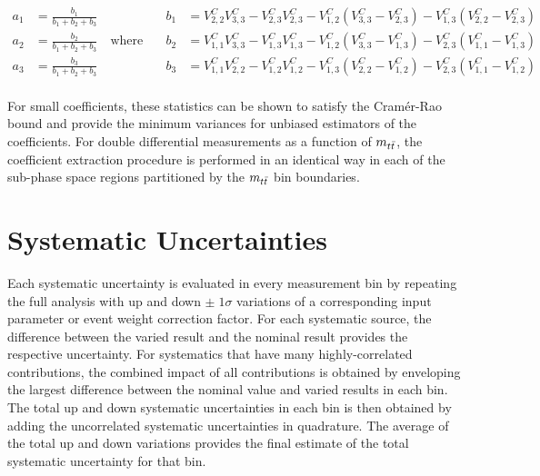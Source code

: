 \begin{linenomath*}
\begin{align*}
  a_1 &= \frac{b_1}{b_1+b_2+b_3} \quad \quad & b_1 &= V^C_{2,2}V^C_{3,3} - V^C_{2,3}V^C_{2,3} - V^C_{1,2}(V^C_{3,3}-V^C_{2,3}) - V^C_{1,3}(V^C_{2,2}-V^C_{2,3}) \\
  a_2 &= \frac{b_2}{b_1+b_2+b_3} \quad \text{where} \quad & b_2 &= V^C_{1,1}V^C_{3,3} - V^C_{1,3}V^C_{1,3} - V^C_{1,2}(V^C_{3,3}-V^C_{1,3}) - V^C_{2,3}(V^C_{1,1}-V^C_{1,3}) \\
  a_3 &= \frac{b_3}{b_1+b_2+b_3} \quad \quad & b_3 &= V^C_{1,1}V^C_{2,2} - V^C_{1,2}V^C_{1,2} - V^C_{1,3}(V^C_{2,2}-V^C_{1,2}) - V^C_{2,3}(V^C_{1,1}-V^C_{1,2}) \\
\end{align*}
\end{linenomath*}
For small coefficients, these statistics can be shown to satisfy the Cramér-Rao bound and provide the minimum variances for unbiased estimators of the coefficients.
For double differential measurements as a function of $m_{t\bar{t}}$, the coefficient extraction procedure is performed in an identical way in each of the sub-phase space regions partitioned by the $m_{t\bar{t}}$ bin boundaries.


\section{Systematic Uncertainties}
\label{Systematic_Uncertainties}
Each systematic uncertainty is evaluated in every measurement bin by repeating the full analysis with up and down $\pm \; 1 \sigma$ variations of a corresponding input parameter or event weight correction factor.
For each systematic source, the difference between the varied result and the nominal result provides the respective uncertainty.
For systematics that have many highly-correlated contributions, the combined impact of all contributions is obtained by enveloping the largest difference between the nominal value and varied results in each bin.
The total up and down systematic uncertainties in each bin is then obtained by adding the uncorrelated systematic uncertainties in quadrature.
The average of the total up and down variations provides the final estimate of the total systematic uncertainty for that bin.

